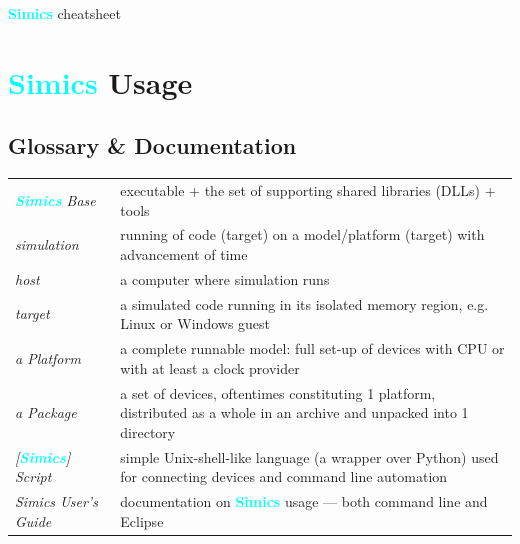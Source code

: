 \documentclass[8pt]{extarticle}
\newcommand{\cod}[2][green!15]{\tcbox[
    size=fbox,
    on line,
    colback=#1,
    colframe=black,
    arc=0.3em  %
]{#2}}
\newcommand{\Simics}{\textcolor{cyan}{\textbf{Simics}}}
\newlength{\MyLen}
\begin{document}
\setlength\emergencystretch{\hsize}


\begin{multicols*}{3}
    {\Large\centering \Simics{} cheatsheet\par}

\section{\Simics{} Usage}

\subsection{Glossary \& Documentation}
    \begin{tabular}{p{\the\MyLen}p{\linewidth-\the\MyLen-0.8cm}}
        \textit{\Simics{} Base} & \cod{simics} executable + the set of
        supporting shared libraries (DLLs) + tools
        \\
        \textit{simulation}  & running of code (target) on
        a model/platform (target) with advancement of time
        \\
        \textit{host}        & a computer where simulation runs
        \\
        \textit{target}      & a simulated
        code running in its isolated memory region, e.g. Linux or
        Windows guest
        \\
        \textit{a Platform}  & a complete runnable model:
        full set-up of devices
        with CPU or with at least a clock provider
        \\
        \textit{a Package}   & a set of devices, oftentimes constituting
        1 platform, distributed as a whole in an archive and unpacked
        into 1 directory
        \\
        \textit{[\Simics] Script} & simple Unix-shell-like language (a wrapper
        over Python) used for connecting devices and command line 
        automation
        \\
        \textit{Simics User’s Guide} & documentation on \Simics{}
        usage — both command line and Eclipse
    \end{tabular}


\end{multicols*}
\end{document}

